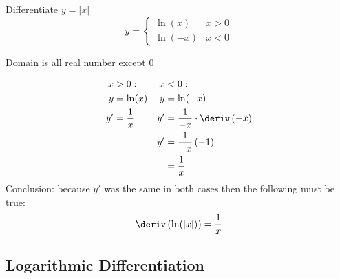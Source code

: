 \begin{example}
    Differentiate $y = \left|x\right|$
    \begin{equation*}
        y = \begin{cases}
            \ln(x) & x > 0 \\
            \ln(-x) & x < 0
        \end{cases}
    \end{equation*}
    \begin{note}
        Domain is all real number except 0
    \end{note}
    \begin{align*}
        x  &> 0:           & x &< 0: \\
        y  &= \ln(x)       & y &= \ln(-x) \\
        y' &= \dfrac{1}{x} & y' &= \dfrac{1}{-x} \cdot \deriv \left(-x\right) \\
           &               & y' &= \dfrac{1}{-x} \left(-1\right) \\
           &               &    &= \dfrac{1}{x}
    \end{align*}
    Conclusion: because $y'$ was the same in both cases then the following must be true:
    \begin{equation*}
        \deriv\left(\ln(\left|x\right|)\right) = \dfrac{1}{x}
    \end{equation*}
\end{example}
\subsection{Logarithmic Differentiation}
